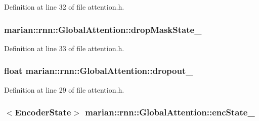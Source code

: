 Definition at line 32 of file attention.\+h.

\subsubsection[{\texorpdfstring{drop\+Mask\+State\+\_\+}{dropMaskState_}}]{ marian\+::rnn\+::\+Global\+Attention\+::drop\+Mask\+State\+\_\+\hspace{0.3cm}{\ttfamily [private]}}\hypertarget{classmarian_1_1rnn_1_1GlobalAttention_a0278e2cbabd73c51991d391e8d736aac}{}\label{classmarian_1_1rnn_1_1GlobalAttention_a0278e2cbabd73c51991d391e8d736aac}


Definition at line 33 of file attention.\+h.

\subsubsection[{\texorpdfstring{dropout\+\_\+}{dropout_}}]{\setlength{\rightskip}{0pt plus 5cm}float marian\+::rnn\+::\+Global\+Attention\+::dropout\+\_\+\hspace{0.3cm}{\ttfamily [private]}}\hypertarget{classmarian_1_1rnn_1_1GlobalAttention_a54448ebcd15a874630f8988e99c77919}{}\label{classmarian_1_1rnn_1_1GlobalAttention_a54448ebcd15a874630f8988e99c77919}


Definition at line 29 of file attention.\+h.

\subsubsection[{\texorpdfstring{enc\+State\+\_\+}{encState_}}]{$<${\bf Encoder\+State}$>$ marian\+::rnn\+::\+Global\+Attention\+::enc\+State\+\_\+\hspace{0.3cm}{\ttfamily [private]}}\hypertarget{classmarian_1_1rnn_1_1GlobalAttention_a937128ef746a33a6d5033e3dc0bb1424}{}\label{classmarian_1_1rnn_1_1GlobalAttention_a937128ef746a33a6d5033e3dc0bb1424}


